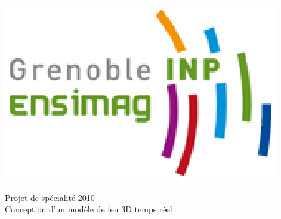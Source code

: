 \documentclass[a4paper,10pt]{article}
\begin{document}


\begin{center}
	\hspace{3cm}
	\includegraphics[scale=0.8]{logo.ps}

	\vspace{1cm}
	{\large Projet de spécialité 2010}\\
	{\Large Conception d'un modèle de feu 3D temps réel}\\
	\vspace{1cm}



\end{center}
\end{document}
